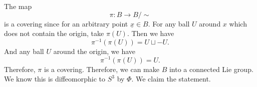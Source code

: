 \documentclass{article}
\numberwithin{equation}{section}
\begin{document}
The map
\begin{equation*}
\pi:B\to B/\sim
\end{equation*}
is a covering since for an arbitrary point $\underline{x}\in B$. For any ball $U$ around $x$ which does not contain the origin, take $\pi(U)$. Then we have
\begin{equation*}
\pi^{-1}(\pi(U)) = U\sqcup -U.
\end{equation*}
And any ball $U$ around the origin, we have
\begin{equation*}
\pi^{-1}(\pi(U)) = U.
\end{equation*}
Therefore, $\pi$ is a covering. Therefore, we can make $B$ into a connected Lie group. We know this is diffeomorphic to $S^3$ by $\Phi$. We claim the statement.
\end{document}

